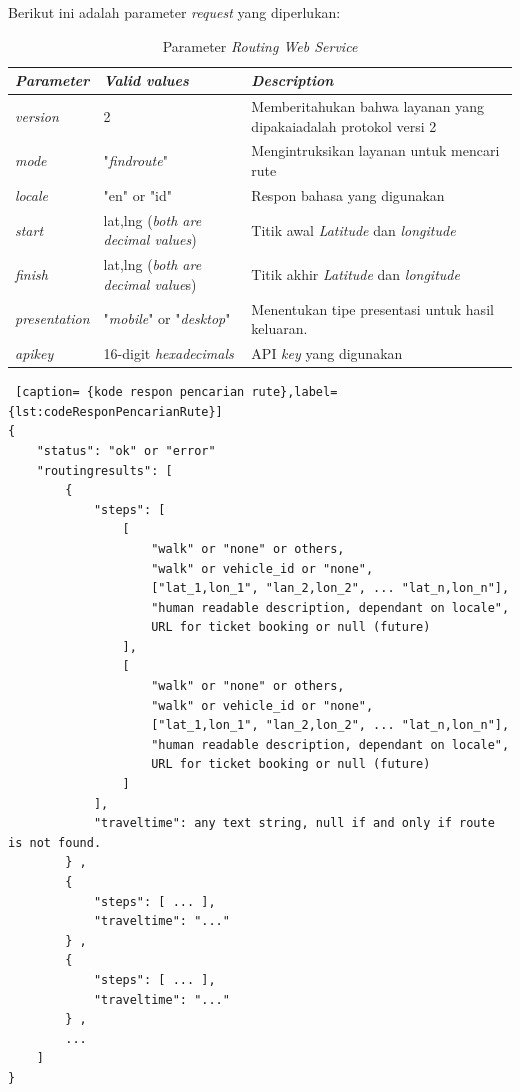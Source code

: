 Berikut ini adalah parameter \textit{request} yang diperlukan:

\begin{table}[h]
\begin{tabular}{ |p{3cm}|p{3cm}|p{8cm}| }
	\hline
	\textit{Parameter} & \textit{Valid values} & \textit{Description} \\ \hline \hline
  \textit{version} & 2 & Memberitahukan bahwa layanan yang dipakaiadalah protokol versi 2 \\ \hline
  \textit{mode} & "\textit{findroute}" & Mengintruksikan layanan untuk mencari rute \\ \hline
  \textit{locale} & "en" or "id" & Respon bahasa yang digunakan \\ \hline
	\textit{start} & lat,lng (\textit{both are decimal values}) & Titik awal \textit{Latitude} dan \textit{longitude} \\ \hline
  \textit{finish} & lat,lng (\textit{both are decimal value}s) & Titik akhir \textit{Latitude} dan \textit{longitude}  \\ \hline
  \textit{presentation} & "\textit{mobile}" or "\textit{desktop}" & Menentukan tipe presentasi untuk hasil keluaran. \\ \hline
	\textit{apikey} & 16-digit \textit{hexadecimals} & API \textit{key} yang digunakan \\ \hline
\end{tabular}
	\caption{Parameter \textit{Routing Web Service}}
	\label{tab:TabelParameterRoutingWebService}
	\end{table}
	
\begin{lstlisting} [caption= {kode respon pencarian rute},label={lst:codeResponPencarianRute}]
{ 
    "status": "ok" or "error" 
    "routingresults": [ 
        {
            "steps": [
                [
                    "walk" or "none" or others,
                    "walk" or vehicle_id or "none",
                    ["lat_1,lon_1", "lan_2,lon_2", ... "lat_n,lon_n"],
                    "human readable description, dependant on locale",
                    URL for ticket booking or null (future)
                ],
                [
                    "walk" or "none" or others,
                    "walk" or vehicle_id or "none",
                    ["lat_1,lon_1", "lan_2,lon_2", ... "lat_n,lon_n"],
                    "human readable description, dependant on locale",
                    URL for ticket booking or null (future)
                ]
            ],
            "traveltime": any text string, null if and only if route is not found.
        } ,
        {
            "steps": [ ... ],
            "traveltime": "..."
        } ,
        {
            "steps": [ ... ],
            "traveltime": "..."
        } ,
        ...     
    ]
}
\end{lstlisting}

